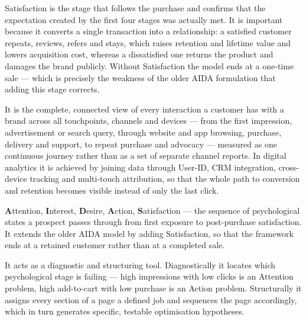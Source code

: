 \begin{qlist}

Satisfaction is the stage that follows the purchase and confirms that the
expectation created by the first four stages was actually met. It is important
because it converts a single transaction into a relationship: a satisfied
customer repeats, reviews, refers and stays, which raises retention and
lifetime value and lowers acquisition cost, whereas a dissatisfied one returns
the product and damages the brand publicly. Without Satisfaction the model ends
at a one-time sale --- which is precisely the weakness of the older AIDA
formulation that adding this stage corrects.

It is the complete, connected view of every interaction a customer has with a
brand across all touchpoints, channels and devices --- from the first
impression, advertisement or search query, through website and app browsing,
purchase, delivery and support, to repeat purchase and advocacy --- measured as
one continuous journey rather than as a set of separate channel reports. In
digital analytics it is achieved by joining data through User-ID, CRM
integration, cross-device tracking and multi-touch attribution, so that the
whole path to conversion and retention becomes visible instead of only the last
click.

\textbf{A}ttention, \textbf{I}nterest, \textbf{D}esire, \textbf{A}ction,
\textbf{S}atisfaction --- the sequence of psychological states a prospect passes
through from first exposure to post-purchase satisfaction. It extends the older
AIDA model by adding Satisfaction, so that the framework ends at a retained
customer rather than at a completed sale.

It acts as a diagnostic and structuring tool. Diagnostically it locates which
psychological stage is failing --- high impressions with low clicks is an
Attention problem, high add-to-cart with low purchase is an Action problem.
Structurally it assigns every section of a page a defined job and sequences the
page accordingly, which in turn generates specific, testable optimisation
hypotheses.


\end{qlist}
